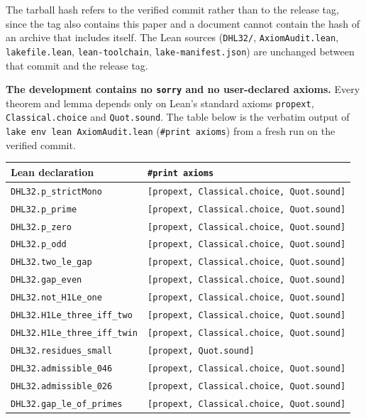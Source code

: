 \documentclass[11pt]{amsart}
\theoremstyle{plain}
\theoremstyle{definition}
\theoremstyle{remark}
\begin{document}
The tarball hash refers to the verified commit rather than to the release tag, since the tag also contains this paper and a document cannot contain the hash of an archive that includes itself. The Lean sources (\texttt{DHL32/}, \texttt{AxiomAudit.lean}, \texttt{lakefile.lean}, \texttt{lean-toolchain}, \texttt{lake-manifest.json}) are unchanged between that commit and the release tag.

\textbf{The development contains no \texttt{sorry} and no user-declared axioms.} Every theorem and lemma depends only on Lean's standard axioms \texttt{propext}, \texttt{Classical.choice} and \texttt{Quot.sound}. The table below is the verbatim output of \texttt{lake env lean AxiomAudit.lean} (\texttt{\#print axioms}) from a fresh run on the verified commit.

\begin{center}\footnotesize
\begin{tabular}{ll}
\hline
Lean declaration & \texttt{\#print axioms} \\
\hline
\texttt{DHL32.p\_strictMono} & \texttt{[propext, Classical.choice, Quot.sound]} \\
\texttt{DHL32.p\_prime} & \texttt{[propext, Classical.choice, Quot.sound]} \\
\texttt{DHL32.p\_zero} & \texttt{[propext, Classical.choice, Quot.sound]} \\
\texttt{DHL32.p\_odd} & \texttt{[propext, Classical.choice, Quot.sound]} \\
\texttt{DHL32.two\_le\_gap} & \texttt{[propext, Classical.choice, Quot.sound]} \\
\texttt{DHL32.gap\_even} & \texttt{[propext, Classical.choice, Quot.sound]} \\
\texttt{DHL32.not\_H1Le\_one} & \texttt{[propext, Classical.choice, Quot.sound]} \\
\texttt{DHL32.H1Le\_three\_iff\_two} & \texttt{[propext, Classical.choice, Quot.sound]} \\
\texttt{DHL32.H1Le\_three\_iff\_twin} & \texttt{[propext, Classical.choice, Quot.sound]} \\
\texttt{DHL32.residues\_small} & \texttt{[propext, Quot.sound]} \\
\texttt{DHL32.admissible\_046} & \texttt{[propext, Classical.choice, Quot.sound]} \\
\texttt{DHL32.admissible\_026} & \texttt{[propext, Classical.choice, Quot.sound]} \\
\texttt{DHL32.gap\_le\_of\_primes} & \texttt{[propext, Classical.choice, Quot.sound]} \\

\end{tabular}
\end{center}
\end{document}
